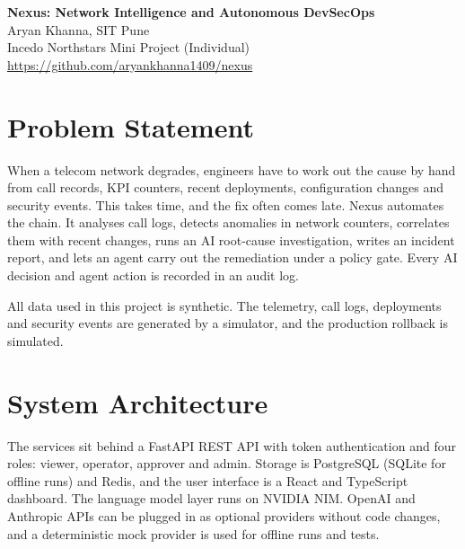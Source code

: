 \documentclass[11pt,a4paper]{article}
\begin{document}
\begin{center}
{\LARGE\bfseries Nexus: Network Intelligence and Autonomous DevSecOps}\\[4pt]
Aryan Khanna, SIT Pune\\
Incedo Northstars Mini Project (Individual)\\
\url{https://github.com/aryankhanna1409/nexus}
\end{center}

\section{Problem Statement}
When a telecom network degrades, engineers have to work out the cause by hand from call records, KPI counters, recent deployments, configuration changes and security events. This takes time, and the fix often comes late. Nexus automates the chain. It analyses call logs, detects anomalies in network counters, correlates them with recent changes, runs an AI root-cause investigation, writes an incident report, and lets an agent carry out the remediation under a policy gate. Every AI decision and agent action is recorded in an audit log.

All data used in this project is synthetic. The telemetry, call logs, deployments and security events are generated by a simulator, and the production rollback is simulated.

\section{System Architecture}
\begin{center}
\end{center}
The services sit behind a FastAPI REST API with token authentication and four roles: viewer, operator, approver and admin. Storage is PostgreSQL (SQLite for offline runs) and Redis, and the user interface is a React and TypeScript dashboard. The language model layer runs on NVIDIA NIM. OpenAI and Anthropic APIs can be plugged in as optional providers without code changes, and a deterministic mock provider is used for offline runs and tests.
\end{document}
